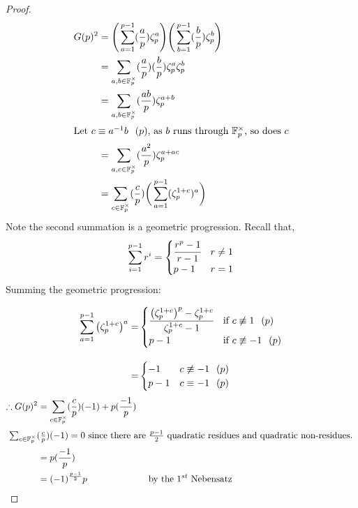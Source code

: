 \documentclass[11pt]{article}
\begin{document}
\begin{proof}
		\begin{align*}
			G(p)^{2} &= \Bigg(\sum^{p-1}_{a=1} (\frac{a}{p}) \zeta^a_p\Bigg)\Bigg(\sum^{p-1}_{b=1} (\frac{b}{p}) \zeta^b_p \Bigg) \\
			&= \sum_{a,b \in \mathbb{F}^\times_p}(\frac{a}{p})(\frac{b}{p})  \zeta^a_p \zeta^b_p\\
			&= \sum_{a,b \in \mathbb{F}^\times_p} (\frac{ab}{p})\zeta^{a+b}_p\\	
			\intertext{Let $c\equiv a^{-1}b \hspace{7pt} (p)$, as $b$ runs through $\mathbb{F}^\times_p$, so does $c$}
			&= \sum_{a,c \in \mathbb{F}^\times_p} (\frac{a^2}{p}) \zeta^{a+ac}_p\\
			&= \sum_{c \in \mathbb{F}^\times_p} (\frac{c}{p})\bigg( \sum_{a=1}^{p-1} (\zeta^{1+c}_p)^a\bigg)
		\end{align*}
		Note the second summation is a geometric progression. Recall that,
	\begin{align*}
		\sum^{p-1}_{i=1} r^i = 
		\begin{cases}
			\cfrac{r^p -1}{r-1} &r \neq 1\\
			p-1 & r=1
		\end{cases}
	\end{align*}
	Summing the geometric progression:

	\begin{align*}
		\sum_{a=1}^{p-1} \big(\zeta^{1+c}_p\big)^{a} =& 
		\begin{cases}
			\cfrac{\big(\zeta_p^{1+c} \big)^p - \zeta^{1+c}_p }{\zeta^{1+c}_p - 1} & \text{if } c \not \equiv 1 \hspace{7pt} (p)\\
			p-1 & \text{if } c \not \equiv -1 \hspace{7pt} (p)
		\end{cases}
		\\[1em] =&
		\begin{cases}
			-1 &c \not \equiv -1 \hspace{7pt} (p)\\
			p-1 & c \equiv -1 \hspace{7pt} (p)
		\end{cases}
	\end{align*}
	\newpage
	\begin{align*}
		\therefore G(p)^2 &= \sum_{c \in \mathbb{F}^\times_p} (\frac{c}{p}) (-1) + p(\frac{-1}{p}) &&\\
		\intertext{ $\sum_{c \in \mathbb{F}^\times_p} (\frac{c}{p}) (-1) = 0$ since there are $\frac{p-1}{2}$ quadratic residues and quadratic non-residues. }
		&= p(\frac{-1}{p}) \\
		&= (-1)^{\frac{p-1}{2}}p &\text{ by the $1^{st}$ Nebensatz}
	\end{align*}
\end{proof}
\end{document}
